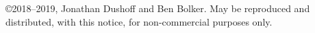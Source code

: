 \copyright 2018--2019, Jonathan Dushoff and Ben Bolker.  May be reproduced and distributed, with this notice, for non-commercial purposes only.
